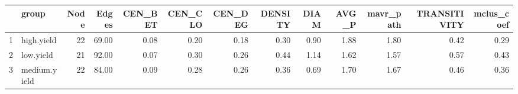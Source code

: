 \begin{table}[ht]
\centering
\begin{tabular}{rlrrrrrrrrrrr}
  \hline
 & group & Node & Edges & CEN\_BET & CEN\_CLO & CEN\_DEG & DENSITY & DIAM & AVG\_P & mavr\_path & TRANSITIVITY & mclus\_coef \\ 
  \hline
1 & high.yield &  22 & 69.00 & 0.08 & 0.20 & 0.18 & 0.30 & 0.90 & 1.88 & 1.80 & 0.42 & 0.29 \\ 
  2 & low.yield &  21 & 92.00 & 0.07 & 0.30 & 0.26 & 0.44 & 1.14 & 1.62 & 1.57 & 0.57 & 0.43 \\ 
  3 & medium.yield &  22 & 84.00 & 0.09 & 0.28 & 0.26 & 0.36 & 0.69 & 1.70 & 1.67 & 0.46 & 0.36 \\ 
   \hline
\end{tabular}
\end{table}